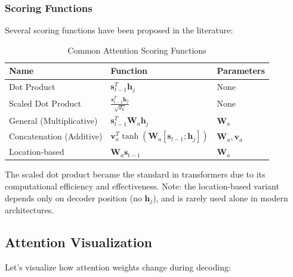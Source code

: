 \subsubsection{Scoring Functions}

Several scoring functions have been proposed in the literature:

\begin{table}[H]
\centering
\caption{Common Attention Scoring Functions}
\begin{tabular}{l l l}
\toprule
\textbf{Name} & \textbf{Function} & \textbf{Parameters} \\
\midrule
Dot Product & $\mathbf{s}_{t-1}^T \mathbf{h}_j$ & None \\
Scaled Dot Product & $\frac{\mathbf{s}_{t-1}^T \mathbf{h}_j}{\sqrt{d_k}}$ & None \\
General (Multiplicative) & $\mathbf{s}_{t-1}^T \mathbf{W}_a \mathbf{h}_j$ & $\mathbf{W}_a$ \\
Concatenation (Additive) & $\mathbf{v}_a^T \tanh(\mathbf{W}_a[\mathbf{s}_{t-1}; \mathbf{h}_j])$ & $\mathbf{W}_a, \mathbf{v}_a$ \\
Location-based & $\mathbf{W}_a \mathbf{s}_{t-1}$ & $\mathbf{W}_a$ \\
\bottomrule
\end{tabular}
\end{table}

The scaled dot product became the standard in transformers due to its computational efficiency and effectiveness. Note: the location-based variant depends only on decoder position (no $\mathbf{h}_j$), and is rarely used alone in modern architectures.

\subsection{Attention Visualization}

Let's visualize how attention weights change during decoding:

